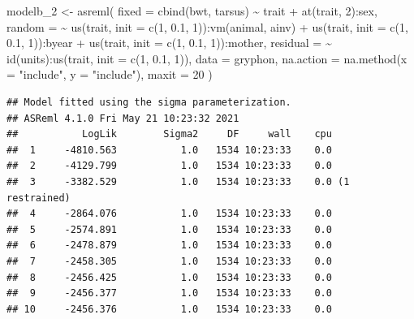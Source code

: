 \documentclass[
  12pt,
]{book}
\newenvironment{Shaded}{\begin{snugshade}}{\end{snugshade}}
\newcommand{\AttributeTok}[1]{\textcolor[rgb]{0.77,0.63,0.00}{#1}}
\newcommand{\DecValTok}[1]{\textcolor[rgb]{0.00,0.00,0.81}{#1}}
\newcommand{\FloatTok}[1]{\textcolor[rgb]{0.00,0.00,0.81}{#1}}
\newcommand{\FunctionTok}[1]{\textcolor[rgb]{0.00,0.00,0.00}{#1}}
\newcommand{\NormalTok}[1]{#1}
\newcommand{\OtherTok}[1]{\textcolor[rgb]{0.56,0.35,0.01}{#1}}
\newcommand{\SpecialCharTok}[1]{\textcolor[rgb]{0.00,0.00,0.00}{#1}}
\newcommand{\StringTok}[1]{\textcolor[rgb]{0.31,0.60,0.02}{#1}}
\begin{document}
\begin{Shaded}
\begin{Highlighting}[]
\NormalTok{modelb\_2 }\OtherTok{\textless{}{-}} \FunctionTok{asreml}\NormalTok{(}
  \AttributeTok{fixed =} \FunctionTok{cbind}\NormalTok{(bwt, tarsus) }\SpecialCharTok{\textasciitilde{}}\NormalTok{ trait }\SpecialCharTok{+} \FunctionTok{at}\NormalTok{(trait, }\DecValTok{2}\NormalTok{)}\SpecialCharTok{:}\NormalTok{sex,}
  \AttributeTok{random =} \SpecialCharTok{\textasciitilde{}} \FunctionTok{us}\NormalTok{(trait, }\AttributeTok{init =} \FunctionTok{c}\NormalTok{(}\DecValTok{1}\NormalTok{, }\FloatTok{0.1}\NormalTok{, }\DecValTok{1}\NormalTok{))}\SpecialCharTok{:}\FunctionTok{vm}\NormalTok{(animal, ainv) }\SpecialCharTok{+}
    \FunctionTok{us}\NormalTok{(trait, }\AttributeTok{init =} \FunctionTok{c}\NormalTok{(}\DecValTok{1}\NormalTok{, }\FloatTok{0.1}\NormalTok{, }\DecValTok{1}\NormalTok{))}\SpecialCharTok{:}\NormalTok{byear }\SpecialCharTok{+}
    \FunctionTok{us}\NormalTok{(trait, }\AttributeTok{init =} \FunctionTok{c}\NormalTok{(}\DecValTok{1}\NormalTok{, }\FloatTok{0.1}\NormalTok{, }\DecValTok{1}\NormalTok{))}\SpecialCharTok{:}\NormalTok{mother,}
  \AttributeTok{residual =} \SpecialCharTok{\textasciitilde{}} \FunctionTok{id}\NormalTok{(units)}\SpecialCharTok{:}\FunctionTok{us}\NormalTok{(trait, }\AttributeTok{init =} \FunctionTok{c}\NormalTok{(}\DecValTok{1}\NormalTok{, }\FloatTok{0.1}\NormalTok{, }\DecValTok{1}\NormalTok{)),}
  \AttributeTok{data =}\NormalTok{ gryphon,}
  \AttributeTok{na.action =} \FunctionTok{na.method}\NormalTok{(}\AttributeTok{x =} \StringTok{"include"}\NormalTok{, }\AttributeTok{y =} \StringTok{"include"}\NormalTok{),}
  \AttributeTok{maxit =} \DecValTok{20}
\NormalTok{)}
\end{Highlighting}
\end{Shaded}

\begin{verbatim}
## Model fitted using the sigma parameterization.
## ASReml 4.1.0 Fri May 21 10:23:32 2021
##           LogLik        Sigma2     DF     wall    cpu
##  1     -4810.563           1.0   1534 10:23:33    0.0
##  2     -4129.799           1.0   1534 10:23:33    0.0
##  3     -3382.529           1.0   1534 10:23:33    0.0 (1 restrained)
##  4     -2864.076           1.0   1534 10:23:33    0.0
##  5     -2574.891           1.0   1534 10:23:33    0.0
##  6     -2478.879           1.0   1534 10:23:33    0.0
##  7     -2458.305           1.0   1534 10:23:33    0.0
##  8     -2456.425           1.0   1534 10:23:33    0.0
##  9     -2456.377           1.0   1534 10:23:33    0.0
## 10     -2456.376           1.0   1534 10:23:33    0.0
\end{verbatim}
\end{document}
